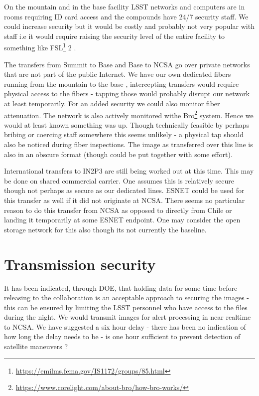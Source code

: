 On the mountain and in the base facility LSST networks and computers are in rooms requiring ID card access and the compounds
have 24/7 security staff.
We could increase security but it would be costly and probably not very popular with staff i.e it would require raising the security level of the entire facility to something like FSL\footnote{\url{https://emilms.fema.gov/IS1172/groups/85.html}} 2 .

The transfers from Summit to Base and Base to NCSA go over private networks that are not part of the public Internet. We have our own dedicated fibers running from the mountain to the base ,
intercepting transfers would require physical access to the fibers - tapping those would probably disrupt our network at least temporarily.
For an added security we could also monitor fiber attenuation.
The network is also actively monitored withe Bro\footnote{\url{https://www.corelight.com/about-bro/how-bro-works/}} system. Hence we would at least known something was up.
Though technically feasible by perhaps bribing or coercing staff somewhere this seems unlikely - a physical tap should also be noticed during fiber inspections.  The image as transferred over this line is also in an obscure format (though could be put together with some effort).


International transfers to IN2P3 are still being worked out at this time. This may be done on shared commercial carrier. One assumes
this is relatively secure though not perhaps as secure as our dedicated lines. ESNET could be used for this transfer as well if it did not originate at NCSA. There seems no particular reason to do this transfer from NCSA as opposed to directly from Chile or landing it
temporarily at some ESNET endpoint. One may consider the open storage network \citep{osn} for this also though its not currently the baseline.


\section{Transmission security} \label{sec:trans}

It has been indicated, through DOE, that holding data for some time before releasing to the collaboration is an acceptable approach to securing the images - this can be ensured by limiting the LSST personnel who have access to the files during the night.
We would transmit images for alert processing in near realtime to NCSA. We have suggested a six hour delay - there has been no indication of how long the delay needs to be - is one hour sufficient to prevent detection of satellite maneuvers ?

